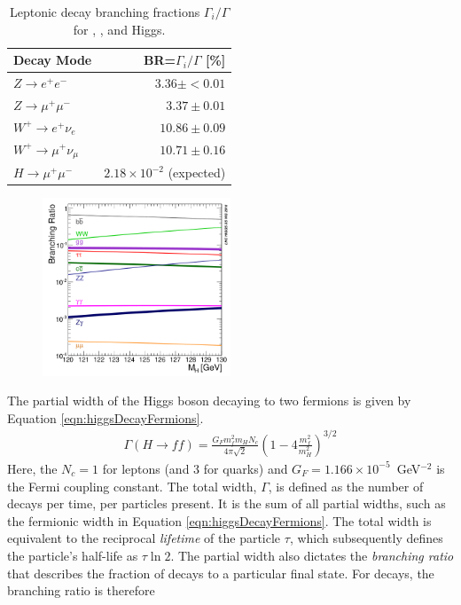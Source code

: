 \begin{table}[htp]
\begin{center}
\begin{tabular}{l r}
\toprule
Decay Mode & BR=$\Gamma_i/\Gamma$ [\%] \\
\midrule
$Z\to e^+e^-$           & $3.36\pm<0.01$ \\
$Z\to \mu^+\mu^-$       & $3.37\pm0.01 $ \\
$W^+\to   e^+\nu_e$     & $10.86\pm0.09$ \\
$W^+\to \mu^+\nu_\mu$   & $10.71\pm0.16$ \\
$H\to \mu^+\mu^-$       & $2.18\times10^{-2}$ (expected) \\
\bottomrule
\end{tabular}
\caption{Leptonic decay branching fractions $\Gamma_i/\Gamma$ for \W, \Z, and Higgs. \cite{pdg2018}}
\label{tab:decayCrossSec}
\end{center}
\end{table}

\begin{figure}[h!]
\captionsetup[subfigure]{position=b}
\centering
\includegraphics[width=0.5\textwidth]{figures/pheno/higgsBr.png}
\caption{}
\label{fig:higgsBr}
\end{figure}

The partial width of the Higgs boson decaying to two fermions is given by Equation \ref{eqn:higgsDecayFermions}.
\begin{equation}\begin{split}\label{eqn:higgsDecayFermions}
\Gamma(H\to ff)=\frac{G_Fm_f^2m_HN_c}{4\pi\sqrt{2}}(1-4\frac{m_f^2}{m_H^2})^{3/2}
\end{split}\end{equation} 
Here, the $N_c=1$ for leptons (and 3 for quarks) and $G_F=1.166\times10^{-5}$~GeV$^{-2}$ is the Fermi coupling constant.
The total width, $\Gamma$, is defined as the number of decays per time, per particles present.
It is the sum of all partial widths, such as the fermionic width in Equation \ref{eqn:higgsDecayFermions}.
The total width is equivalent to the reciprocal \emph{lifetime} of the particle $\tau$, which subsequently defines the particle's half-life as $\tau\ln2$.
The partial width also dictates the \emph{branching ratio} that describes the fraction of decays to a particular final state.
For \hmm decays, the branching ratio is therefore

